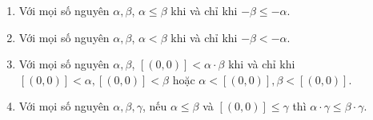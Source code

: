 \begin{theorem}\label{theorem:integers-order-and-operations-sequel}
	\begin{enumerate}[label={(\roman*)}]
		\item Với mọi số nguyên $\alpha, \beta$, $\alpha\leq \beta$ khi và chỉ khi $-\beta\leq-\alpha$.
		\item Với mọi số nguyên $\alpha, \beta$, $\alpha < \beta$ khi và chỉ khi $-\beta < -\alpha$.
		\item Với mọi số nguyên $\alpha, \beta$, $[(0,0)] < \alpha\cdot \beta$ khi và chỉ khi $[(0,0)] < \alpha, [(0,0)] < \beta$ hoặc $\alpha < [(0,0)], \beta < [(0,0)]$.
		\item Với mọi số nguyên $\alpha, \beta, \gamma$, nếu $\alpha\leq\beta$ và $[(0,0)]\leq\gamma$ thì $\alpha\cdot\gamma \leq \beta\cdot\gamma$.
	\end{enumerate}
\end{theorem}

